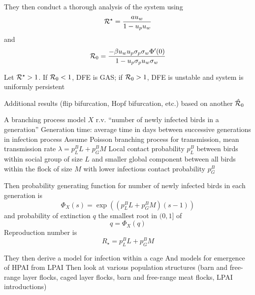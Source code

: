 \documentclass[aspectratio=43]{beamer}
\begin{document}
\begin{frame}
  They then conduct a thorough analysis of the system using 
  \[
    \mathcal{R}^\star = \frac{au_w}{1-u_pu_w}
  \]
  and
  \[
    \mathcal{R}_0=\frac{-\beta u_wu_p\sigma_p\sigma_w\Phi'(0)}{1-u_p\sigma_pu_w\sigma_w}
  \]
  \vfill
  \begin{proposition}
    Let $\mathcal{R}^\star>1$. If $\mathcal{R}_0<1$, DFE is GAS; if $\mathcal{R}_0>1$, DFE is unstable and system is uniformly persistent
  \end{proposition}
  Additional results (flip bifurcation, Hopf bifurcation, etc.) based on another $\hat{\mathcal{R}}_0$
\end{frame}




\begin{frame}{A branching process model}
  $X$ r.v. ``number of newly infected birds in a generation''
  \vfill
  Generation time: average time in days between successive generations in infection process
  \vfill
  Assume Poisson branching process for transmission, mean transmission rate $\lambda=p_L^BL+p_G^BM$
  \vfill
  Local contact probability $p_L^B$ between birds within social group of size $L$ and smaller global component between all birds within the flock of size $M$ with lower infectious contact probability $p_G^B$
\end{frame}

\begin{frame}
  Then probability generating function for number of newly infected birds in each generation is
  \[
    \Phi_X(s)=\exp\left(
      (p_L^BL+p_G^BM)(s-1)
    \right)
  \]
  and probability of extinction $q$ the smallest root in $(0,1]$ of
  \[
    q=\Phi_X(q)
  \]
  \vfill
  Reproduction number is
  \[
    R_\star = p_L^BL+p_G^BM
  \]
\end{frame}

\begin{frame}
  They then derive a model for infection within a cage
  \vfill
  And models for emergence of HPAI from LPAI
  \vfill
  Then look at various population structures (barn and free-range layer flocks, caged layer flocks, barn and free-range meat flocks, LPAI introductions)
\end{frame}



\end{document}
